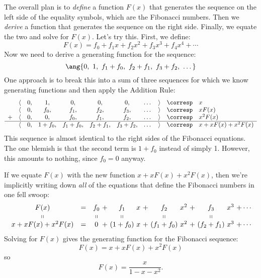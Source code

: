 The overall plan is to \emph{define} a function $F(x)$ that
generates the sequence on the left side of the equality symbols, which
are the Fibonacci numbers.  Then we \emph{derive} a function that
generates the sequence on the right side.  Finally, we equate the two
and solve for $F(x)$.  Let's try this.  First, we define:
%
\[
F(x) = f_0 + f_1 x + f_2 x^2 + f_3 x^3 + f_4 x^4 + \cdots
\]
%
Now we need to derive a generating function for the sequence:
%
\[
\ang{0,\ 1,\ f_1 + f_0,\ f_2 + f_1,\ f_3 + f_2,\ \dots}
\]
%
One approach is to break this into a sum of three sequences for which
we know generating functions and then apply the Addition Rule:
%
\[
\begin{array}{ccccccccccl}
  & \langle & 0, & 1, & 0, & 0, & 0, & \dots & \rangle
    & \corresp & x \\
  & \langle & 0, & f_0, & f_1, & f_2, & f_3, & \dots & \rangle
    & \corresp & x F(x) \\
+ & \langle & 0, & 0, & f_0, & f_1, & f_2, & \dots & \rangle
    & \corresp & x^2 F(x) \\ \hline
  & \langle & 0, & 1 + f_0, & f_1 + f_0, & f_2 + f_1, & f_3 + f_2, & \dots & \rangle
    & \corresp & x + x F(x) + x^2 F(x) \\
\end{array}
\]
%
This sequence is almost identical to the right sides of the Fibonacci
equations.  The one blemish is that the second term is $1 + f_0$
instead of simply 1.  However, this amounts to nothing, since $f_0 =
0$ anyway.

If we equate $F(x)$ with the new function $x + x F(x) + x^2 F(x)$,
then we're implicitly writing down \emph{all} of the equations that
define the Fibonacci numbers in one fell swoop:
%
\[
\begin{array}{ccc@{\ }c@{\ }c@{\ }c@{\ }c@{\ }c@{\ }c@{\ }c@{\ }c@{\ }c@{\ }c@{\ }c@{\ }c}
F(x)
    & = & f_0 & + & f_1 & x & + & f_2 & x^2 & + & f_3 & x^3 & + \cdots \\
\shortparallel && \shortparallel && \shortparallel &&& \shortparallel &&& \shortparallel\\
x + x F(x) + x^2 F(x)
    & = & 0 & + & (1 + f_0) & x & + & (f_1 + f_0) & x^2 & + & (f_2 + f_1) & x^3 & + \cdots
\end{array}
\]
%
Solving for $F(x)$ gives the generating function for the Fibonacci
sequence:
%
\[
F(x)  = x + x F(x) + x^2 F(x)
\]
so
\begin{equation}\label{eqn:12T4}
F(x) = \frac{x}{1 - x - x^2}.
\end{equation}


